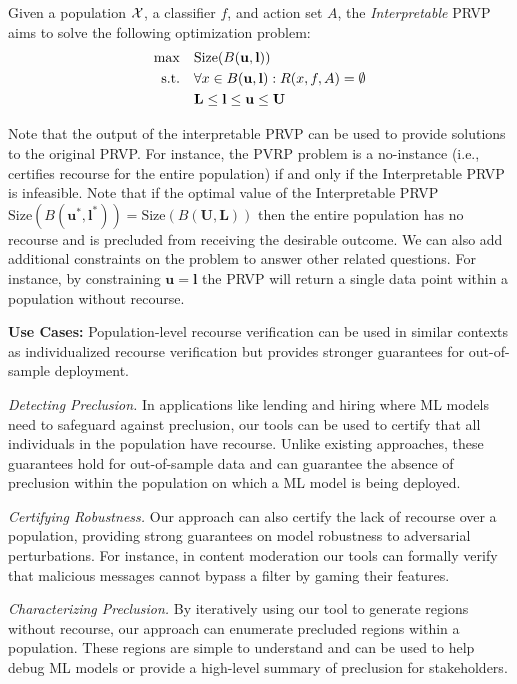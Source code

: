 Given a population ${\cal X}$, a classifier $f$, and action set $A$, the \textit{Interpretable} PRVP aims to solve the following optimization problem:
\begin{align*}
\begin{split}
        \max\quad& \text{Size}(B(\mathbf{u}, \mathbf{l}))\\
        \textnormal{s.t.}\quad & \forall x \in B(\mathbf{u}, \mathbf{l}): R(x, f, A) = \emptyset\\
        & \mathbf{L} \leq \mathbf{l} \leq \mathbf{u} \leq \mathbf{U}
\end{split}
\end{align*}

Note that the output of the interpretable PRVP can be used to provide solutions to the original PRVP. For instance, the PVRP problem is a no-instance (i.e., certifies recourse for the entire population) if and only if the Interpretable PRVP is infeasible. Note that if the optimal value of the Interpretable PRVP $\text{Size}(B(\mathbf{u}^*, \mathbf{l}^*)) = \text{Size}(B(\mathbf{U}, \mathbf{L}))$ then the entire population has no recourse and is precluded from receiving the desirable outcome. We can also add additional constraints on the problem to answer other related questions. For instance, by constraining $\mathbf{u} = \mathbf{l}$ the PRVP will return a single data point within a population without recourse. 

\textbf{Use Cases:} Population-level recourse verification can be used in similar contexts as individualized recourse verification but provides stronger guarantees for out-of-sample deployment. %

\emph{Detecting Preclusion.} In applications like lending and hiring where ML models need to safeguard against preclusion, our tools can be used to certify that all individuals in the population have recourse. Unlike existing approaches, these guarantees hold for out-of-sample data and can guarantee the absence of preclusion within the population on which a ML model is being deployed. 

\emph{Certifying Robustness.} Our approach can also certify the lack of recourse over a population, providing strong guarantees on model robustness to adversarial perturbations. For instance, in content moderation our tools can formally verify that malicious messages cannot bypass a filter by gaming their features. 

\emph{Characterizing Preclusion.} By iteratively using our tool to generate regions without recourse, our approach can enumerate precluded regions within a population. These regions are simple to understand and can be used to help debug ML models or provide a high-level summary of preclusion for stakeholders. 


